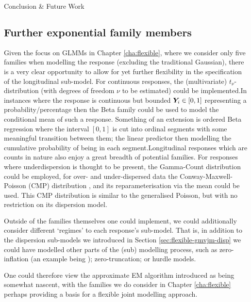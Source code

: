 \begin{chapter}{\label{cha:conclusion}Conclusion \& Future Work}
\subsection{Further exponential family members}\label{sec:conclusion-future-families}
Given the focus on GLMMs in Chapter \ref{cha:flexible}, where we consider only five families when modelling the response (excluding the traditional Gaussian), there is a very clear opportunity to allow for yet further flexibility in the specification of the longitudinal sub-model. For continuous responses, the (multivariate) $t_\nu$-distribution (with degrees of freedom $\nu$ to be estimated) could be implemented.\newline In instances where the response is continuous but bounded $\bm{Y}_i\in[0,1]$ \eg representing a probability/percentage then the Beta family could be used to model the conditional mean of such a response. Something of an extension is ordered Beta regression \citep{Ordbetareg} where the interval $[0,1]$ is cut into ordinal segments with some meaningful transition between them; the linear predictor then modelling the cumulative probability of being in each segment.\newline Longitudinal responses which are counts in nature also enjoy a great breadth of potential families. For responses where underdispersion is thought to be present, the Gamma-Count distribution \citep{GammaCount} could be employed, for over- and under-dispersed data the Conway-Maxwell-Poisson (CMP) distribution \citep{ConwayMaxwell, Shmueli2005}, and its reparameterisation via the mean \citep{Huang2017} could be used. This CMP distribution is similar to the generalised Poisson, but with no restriction on its dispersion model.

Outside of the families themselves one could implement, we could additionally consider different `regimes' to each response's sub-model. That is, in addition to the dispersion sub-models we introduced in Section \ref{sec:flexible-gmvjm-disp} we could have modelled other parts of the (sub) modelling process, such as zero-inflation (an example being \citet{Zhu2018}); zero-truncation; or hurdle models.

One could therefore view the approximate EM algorithm introduced as being somewhat nascent, with the families we do consider in Chapter \ref{cha:flexible} perhaps providing a basis for a flexible joint modelling approach.


\end{chapter}
